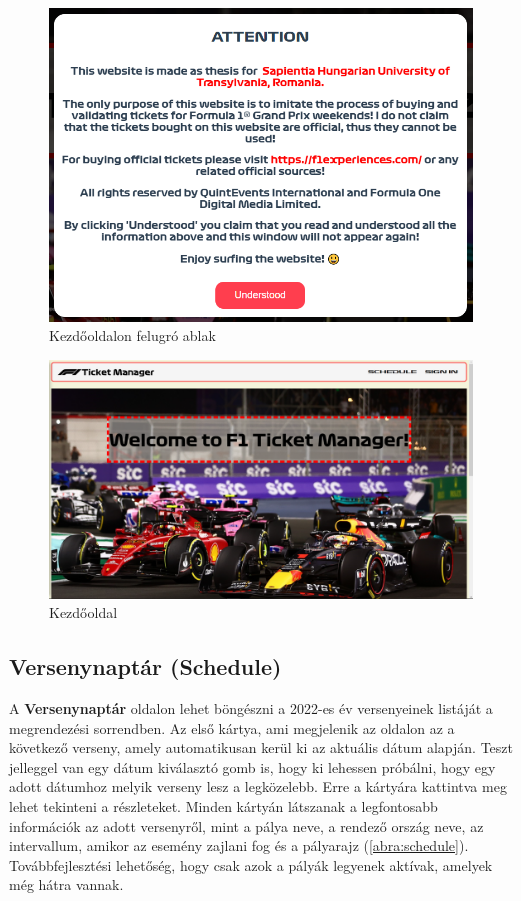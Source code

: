 \begin{figure}[!h]
	\centering
	\includegraphics[scale=0.4]{images/homepagePopup}
	\caption{Kezdőoldalon felugró ablak}
	\label{abra:homepagePopup}
\end{figure}
\pagebreak

\begin{figure}[!h]
	\centering
	\includegraphics[scale=0.2]{images/homepage}
	\caption{Kezdőoldal}
	\label{abra:homepage}
\end{figure}
\pagebreak

\subsection {Versenynaptár (Schedule)}

A \textbf{Versenynaptár} oldalon lehet böngészni a 2022-es év versenyeinek listáját a megrendezési sorrendben. Az első kártya, ami megjelenik az oldalon az a következő verseny, amely automatikusan kerül ki az aktuális dátum alapján. Teszt jelleggel van egy dátum kiválasztó gomb is, hogy ki lehessen próbálni, hogy egy adott dátumhoz melyik verseny lesz a legközelebb. Erre a kártyára kattintva meg lehet tekinteni a részleteket. Minden kártyán látszanak a legfontosabb információk az adott versenyről, mint a pálya neve, a rendező ország neve, az intervallum, amikor az esemény zajlani fog és a pályarajz (\ref{abra:schedule}). Továbbfejlesztési lehetőség, hogy csak azok a pályák legyenek aktívak, amelyek még hátra vannak.

